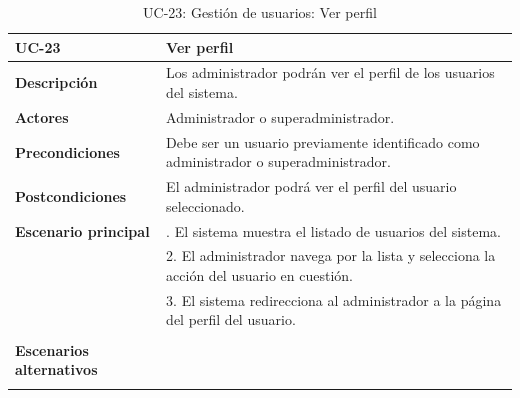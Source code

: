 \begin{table}[H]
  \begin{center}
    \begin{tabularx}{16.4cm}{|l|X|}
      \hline
      \textbf{UC-23} & \textbf{Ver perfil}\\
      \hline
      \textbf{Descripción} & Los administrador podrán ver el perfil de los usuarios del sistema.\\
      \hline
      \textbf{Actores} & Administrador o superadministrador.\\
      \hline
      \textbf{Precondiciones} & Debe ser un usuario previamente identificado como administrador o superadministrador.\\
      \hline
      \textbf{Postcondiciones} & El administrador podrá ver el perfil del usuario seleccionado.\\
      \hline
      \textbf{Escenario principal} & \smallskip 1. El sistema muestra el listado de usuarios del sistema.\\
      & 2. El administrador navega por la lista y selecciona la acción del usuario en cuestión.\\
      & 3. El sistema redirecciona al administrador a la página del perfil del usuario.\\
      & \\
      \hline
      \textbf{Escenarios alternativos} & \\
      & \\
      \hline
    \end{tabularx}
    \caption{UC-23: Gestión de usuarios: Ver perfil}
    \label{tab:CU-ver-perfil-admin}
  \end{center}
\end{table}


